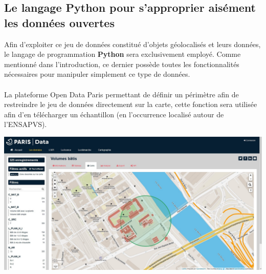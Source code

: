 \documentclass[
  11pt,
  french,
]{article}
\newcounter{customfigs}[section]
\newenvironment{customfigs}[1][] {
    \stepcounter{customfigs}
    Fig \arabic{section}. \arabic{customfigs} : }
\newcommand{\masked}{\vspace*{-\baselineskip}}
\begin{document}
\newpage

\hypertarget{le-langage-python-pour-sapproprier-aisuxe9ment-les-donnuxe9es-ouvertes}{%
\subsection{Le langage Python pour s'approprier aisément les données
ouvertes}\label{le-langage-python-pour-sapproprier-aisuxe9ment-les-donnuxe9es-ouvertes}}

Afin d'exploiter ce jeu de données constitué d'objets géolocalisés et
leurs données, le langage de programmation \textbf{Python} sera
exclusivement employé. Comme mentionné dans l'introduction, ce dernier
possède toutes les fonctionnalités nécessaires pour manipuler simplement
ce type de données.\\
~\\
La plateforme Open Data Paris permettant de définir un périmètre afin de
restreindre le jeu de données directement sur la carte, cette fonction
sera utilisée afin d'en télécharger un échantillon (en l'occurrence
localisé autour de l'ENSAPVS).\\

\begin{tcolorbox}[title=\begin{customfigs} Définition d'une zone d'extraction de données des volumes bâtis \end{customfigs}]

\begin{center}\includegraphics[width=1\linewidth]{__imgs/site_odp_carte_zone} \end{center}

\end{tcolorbox}
\end{document}
